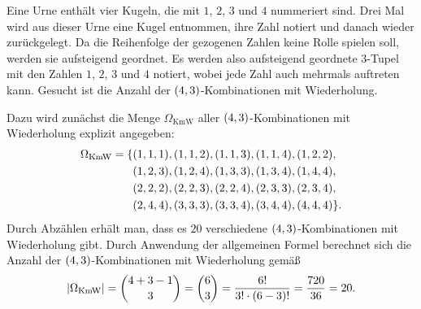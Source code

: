 \documentclass{lecture}
\begin{document}
    \begin{example}
        Eine Urne enthält vier Kugeln, die mit \(1\), \(2\), \(3\) und \(4\) nummeriert sind.
        Drei Mal wird aus dieser Urne eine Kugel entnommen, ihre Zahl notiert und danach wieder zurückgelegt.
        Da die Reihenfolge der gezogenen Zahlen keine Rolle spielen soll, werden sie aufsteigend geordnet.
        Es werden also aufsteigend geordnete \(3\)-Tupel mit den Zahlen \(1\), \(2\), \(3\) und \(4\) notiert, wobei jede Zahl auch mehrmals auftreten kann.
        Gesucht ist die Anzahl der \(\parentheses*{4, 3}\)-Kombinationen mit Wiederholung.

        Dazu wird zunächst die Menge \(\Omega_{\text{KmW}}\) aller \(\parentheses*{4, 3}\)-Kombinationen mit Wiederholung explizit angegeben:
        \begin{align*}
            \Omega_{\text{KmW}} = \{&\parentheses*{1, 1, 1}, \parentheses*{1, 1, 2}, \parentheses*{1, 1, 3}, \parentheses*{1, 1, 4}, \parentheses*{1, 2, 2},\\
            &\parentheses*{1, 2, 3}, \parentheses*{1, 2, 4}, \parentheses*{1, 3, 3}, \parentheses*{1, 3, 4}, \parentheses*{1, 4, 4},\\
            &\parentheses*{2, 2, 2}, \parentheses*{2, 2, 3}, \parentheses*{2, 2, 4}, \parentheses*{2, 3, 3}, \parentheses*{2, 3, 4},\\
            &\parentheses*{2, 4, 4}, \parentheses*{3, 3, 3}, \parentheses*{3, 3, 4}, \parentheses*{3, 4, 4}, \parentheses*{4, 4, 4}\}.
        \end{align*}
        Durch Abzählen erhält man, dass es \(20\) verschiedene \(\parentheses*{4, 3}\)-Kombinationen mit Wiederholung gibt.
        Durch Anwendung der allgemeinen Formel berechnet sich die Anzahl der \(\parentheses*{4, 3}\)-Kombinationen mit Wiederholung gemäß
        \[
            \absolute*{\Omega_{\text{KmW}}} = \binom{4 + 3 - 1}{3} = \binom{6}{3} = \frac{6!}{3! \cdot \parentheses*{6 - 3}!} = \frac{720}{36} = 20.
        \]
    \end{example}
\end{document}
